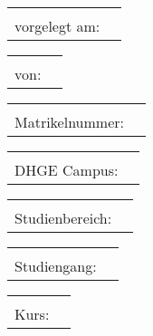 \vspace{\fill}
\maketitle
\begin{tabular}{rl}
	\hspace{0.45\textwidth} &       \\
	vorgelegt am: & \CDATUM
	\end{tabular}

\begin{tabular}{rl}
	\hspace{0.45\textwidth} &              \\
			von: & \CAUTHOR
\end{tabular}

\begin{tabular}{rl}
	\hspace{0.45\textwidth} &         \\
	Matrikelnummer: & \CMATRIKEL
\end{tabular}

\begin{tabular}{rl}
	\hspace{0.45\textwidth} &      \\
	DHGE Campus: & \CCAMPUS
\end{tabular}

\begin{tabular}{rl}
	\hspace{0.45\textwidth} &         \\
	Studienbereich: & \CBEREICH
\end{tabular}

\begin{tabular}{rl}
	\hspace{0.45\textwidth} &                       \\
	Studiengang: & \CSTUDIENGANG
\end{tabular}

\begin{tabular}{rl}
	\hspace{0.45\textwidth} &       \\
			Kurs: & \CKURS
\end{tabular}

\vspace*{\fill}

\pagebreak

